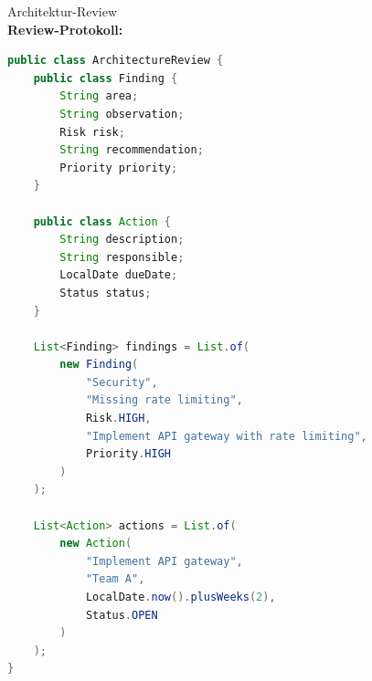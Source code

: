 \begin{example2}{Architektur-Review}\\
\textbf{Review-Protokoll:}

\begin{lstlisting}[language=Java, style=basesmol]
public class ArchitectureReview {
    public class Finding {
        String area;
        String observation;
        Risk risk;
        String recommendation;
        Priority priority;
    }
    
    public class Action {
        String description;
        String responsible;
        LocalDate dueDate;
        Status status;
    }
    
    List<Finding> findings = List.of(
        new Finding(
            "Security",
            "Missing rate limiting",
            Risk.HIGH,
            "Implement API gateway with rate limiting",
            Priority.HIGH
        )
    );
    
    List<Action> actions = List.of(
        new Action(
            "Implement API gateway",
            "Team A",
            LocalDate.now().plusWeeks(2),
            Status.OPEN
        )
    );
}
\end{lstlisting}
\end{example2}